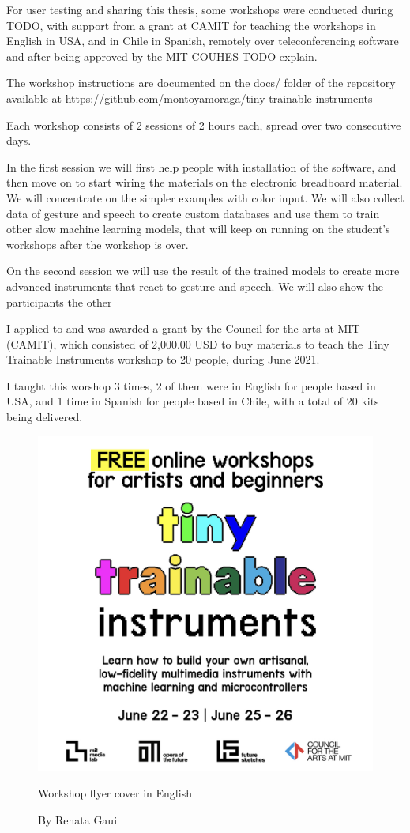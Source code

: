 For user testing and sharing this thesis, some workshops were conducted during TODO, with support from a grant at CAMIT for teaching the workshops in English in USA, and in Chile in Spanish, remotely over teleconferencing software and after being approved by the MIT COUHES TODO explain.

The workshop instructions are documented on the docs/ folder of the repository available at \url{https://github.com/montoyamoraga/tiny-trainable-instruments}

Each workshop consists of 2 sessions of 2 hours each, spread over two consecutive days.

In the first session we will first help people with installation of the software, and then move on to start wiring the materials on the electronic breadboard material. We will concentrate on the simpler examples with color input. We will also collect data of gesture and speech to create custom databases and use them to train other slow machine learning models, that will keep on running on the student's workshops after the workshop is over.

On the second session we will use the result of the trained models to create more advanced instruments that react to gesture and speech. We will also show the participants the other 

I applied to and was awarded a grant by the Council for the arts at MIT (CAMIT), which consisted of 2,000.00 USD to buy materials to teach the Tiny Trainable Instruments workshop to 20 people, during June 2021.

I taught this worshop 3 times, 2 of them were in English for people based in USA, and 1 time in Spanish for people based in Chile, with a total of 20 kits being delivered.

\begin{figure}[h]
  \centering
  \includegraphics[width=0.75\linewidth,height=0.35\textheight,keepaspectratio]{images/workshop-en-1.jpg}
  \caption{Workshop flyer cover in English}
  \caption*{By Renata Gaui}
  \label{fig:workshop-english-flyer-page-1}
\end{figure}

